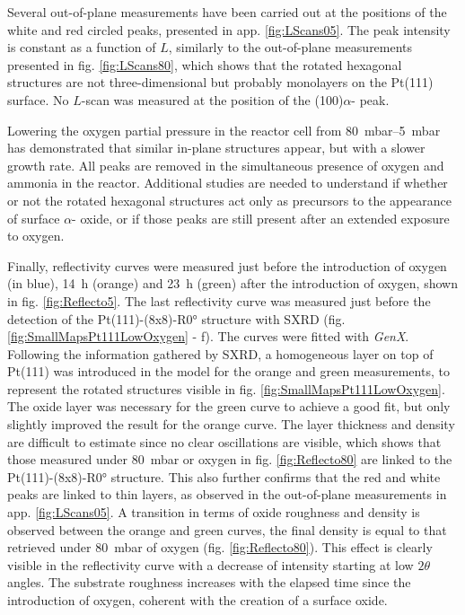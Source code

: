 Several out-of-plane measurements have been carried out at the positions of the white and red circled peaks, presented in app. \ref{fig:LScans05}.
The peak intensity is constant as a function of $L$, similarly to the out-of-plane measurements presented in fig. \ref{fig:LScans80}, which shows that the rotated hexagonal structures are not three-dimensional but probably monolayers on the Pt(111) surface.
No $L$-scan was measured at the position of the (100)$\alpha$- peak.

Lowering the oxygen partial pressure in the reactor cell from \qtyrange{80}{5}{\milli\bar} has demonstrated that similar in-plane structures appear, but with a slower growth rate.
All peaks are removed in the simultaneous presence of oxygen and ammonia in the reactor.
Additional studies are needed to understand if whether or not the rotated hexagonal structures act only as precursors to the appearance of surface $\alpha$- oxide, or if those peaks are still present after an extended exposure to oxygen.

Finally, reflectivity curves were measured just before the introduction of oxygen (in blue), \qty{14}{\hour} (orange) and \qty{23}{\hour} (green) after the introduction of oxygen, shown in fig. \ref{fig:Reflecto5}.
The last reflectivity curve was measured just before the detection of the Pt(111)-(8x8)-R\ang{0} structure with SXRD (fig. \ref{fig:SmallMapsPt111LowOxygen} - f).
The curves were fitted with \textit{GenX}.
Following the information gathered by SXRD, a homogeneous layer on top of Pt(111) was introduced in the model for the orange and green measurements, to represent the rotated structures visible in fig. \ref{fig:SmallMapsPt111LowOxygen}.
The oxide layer was necessary for the green curve to achieve a good fit, but only slightly improved the result for the orange curve.
The layer thickness and density are difficult to estimate since no clear oscillations are visible, which shows that those measured under \qty{80}{\milli\bar} or oxygen in fig. \ref{fig:Reflecto80} are linked to the Pt(111)-(8x8)-R\ang{0} structure.
This also further confirms that the red and white peaks are linked to thin layers, as observed in the out-of-plane measurements in app. \ref{fig:LScans05}.
A transition in terms of oxide roughness and density is observed between the orange and green curves, the final density is equal to that retrieved under \qty{80}{\milli\bar} of oxygen (fig. \ref{fig:Reflecto80}).
This effect is clearly visible in the reflectivity curve with a decrease of intensity starting at low $2\theta$ angles.
The substrate roughness increases with the elapsed time since the introduction of oxygen, coherent with the creation of a surface oxide.


